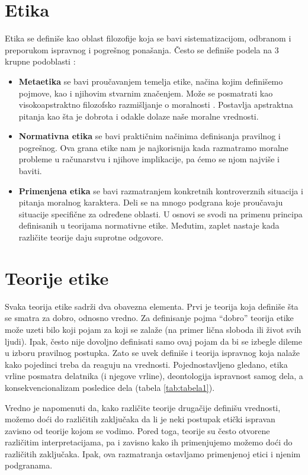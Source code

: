 \documentclass[a4paper]{article}
\begin{document}
\section{Etika}
Etika se definiše kao oblast filozofije koja se bavi sistematizacijom, odbranom i preporukom ispravnog i pogrešnog ponašanja. Često se definiše podela na 3 krupne podoblasti \cite{ethics-iep}:

\begin{itemize}
	\item \textbf{Metaetika} se bavi proučavanjem temelja etike, načina kojim definišemo pojmove, kao i njihovim stvarnim značenjem. Može se posmatrati kao visokoapstraktno filozofsko razmišljanje o moralnosti \cite{metaethics-iep}. Postavlja apstraktna pitanja kao šta je dobrota i odakle dolaze naše moralne vrednosti.
	\item \textbf{Normativna etika} se bavi praktičnim načinima definisanja pravilnog i pogrešnog. Ova grana etike nam je najkorisnija kada razmatramo moralne probleme u računarstvu i njihove implikacije, pa ćemo se njom najviše i baviti. 
	\item \textbf{Primenjena etika} se bavi razmatranjem konkretnih kontroverznih situacija i pitanja moralnog karaktera. Deli se na mnogo podgrana koje proučavaju situacije specifične za određene oblasti. U osnovi se svodi na primenu principa definisanih u teorijama normativne etike. Međutim, zaplet nastaje kada različite teorije daju suprotne odgovore. 
\end{itemize}

\section{Teorije etike}
Svaka teorija etike sadrži dva obavezna elementa. Prvi je teorija koja definiše šta se smatra za dobro, odnosno vredno. Za definisanje pojma ``dobro'' teorija etike može uzeti bilo koji pojam za koji se zalaže (na primer lična sloboda ili život svih ljudi). Ipak, često nije dovoljno definisati samo ovaj pojam da bi se izbegle dileme u izboru pravilnog postupka. Zato se uvek definiše i teorija ispravnog koja nalaže kako pojedinci treba da reaguju na vrednosti. Pojednostavljeno gledano, etika vrline posmatra delatnika (i njegove vrline), deontologija ispravnost samog dela, a konsekvencionalizam posledice dela (tabela \ref{tab:tabela1}). 

Vredno je napomenuti da, kako različite teorije drugačije definišu vrednosti, možemo doći do različitih zaključaka da li je neki postupak etički ispravan zavisno od teorije kojom se vodimo. Pored toga, teorije su često otvorene različitim interpretacijama, pa i zavisno kako ih primenjujemo možemo doći do različitih zaključaka. Ipak, ova razmatranja ostavljamo primenjenoj etici i njenim podgranama. 
\end{document}
